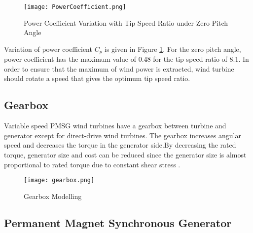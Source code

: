 \begin{figure}[h!]
	\centering
	\texttt{[image: PowerCoefficient.png]}
	\caption{Power Coefficient Variation with Tip Speed Ratio under Zero Pitch Angle}
	\label{variationofcp}
\end{figure} 
Variation of power coefficient $C_{p}$ is given in Figure \ref{variationofcp}. For the zero pitch angle, power coefficient has the maximum value of 0.48 for the tip speed ratio of 8.1. In order to ensure that the maximum of wind power is extracted, wind turbine should rotate a speed that gives the optimum tip speed ratio. 

\subsection{Gearbox}  
Variable speed PMSG wind turbines have a gearbox between turbine and generator except for direct-drive wind turbines. The gearbox increases angular speed and decreases the torque in the generator side.By decreasing the rated torque, generator size and cost can be reduced since the generator size is almost proportional to rated torque due to constant shear stress \cite{Polinder2013aa}.
\begin{figure}[h!]
	\centering
	\texttt{[image: gearbox.png]}
	\caption{Gearbox Modelling}
	\label{gearboxmodel}
\end{figure}

\subsection{Permanent Magnet Synchronous Generator}  